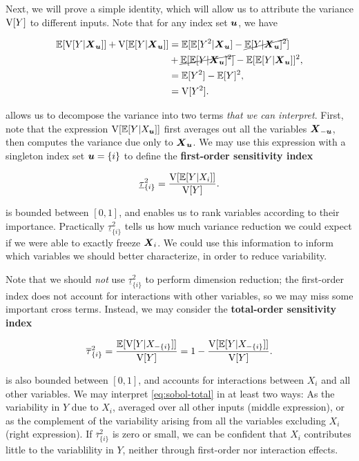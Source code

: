 \documentclass[../primer.tex]{subfiles}
\begin{document}
Next, we will prove a simple identity, which will allow us to attribute the
variance $\mathrm{V}[Y]$ to different inputs. Note that for any index set $\boldsymbol{u}$, we have

\begin{equation}\begin{aligned}\label{eq:var-decomp}
  \E[\V[Y|\mX_{\vu}]] + \V[\E[Y|\mX_{\vu}]] &= %
  \E[\E[Y^2|\mX_{\vu}] - \cancel{ \E[Y|\mX_{\vu}]^2 }] \\
  &+ \cancel{\E[\E[Y|\mX_{\vu}]^2]} - \E[\E[Y|\mX_{\vu}]]^2, \\
  &= \E[Y^2] - \E[Y]^2, \\
  &= \V[Y^2].
\end{aligned}\end{equation}

\noindent {} allows us to decompose the variance into two
terms \emph{that we can interpret}. First, note that the expression
$\mathrm{V}[\mathbb{E}[Y|X_{\boldsymbol{u}}]]$ first averages out all the variables $\boldsymbol{X}_{-\boldsymbol{u}}$, then
computes the variance due only to $\boldsymbol{X}_{\boldsymbol{u}}$. We may use this expression with a
singleton index set $\boldsymbol{u}=\{i\}$ to define the \textbf{first-order sensitivity
  index}

\begin{equation}\label{eq:sobol-first}
  \underline{\tau}_{\{i\}}^2 = \frac{\mathrm{V}[\mathbb{E}[Y|X_i]]}{\mathrm{V}[Y]}.
\end{equation}

\noindent {} is bounded between $[0,1]$, and enables us to
rank variables according to their importance. Practically
$\underline{\tau}_{\{i\}}^2$ tells us how much variance reduction we could
expect if we were able to exactly freeze $\boldsymbol{X}_i$. We could use this information
to inform which variables we should better characterize, in order to reduce
variability.

Note that we should \emph{not} use $\underline{\tau}_{\{i\}}^2$ to perform
dimension reduction; the first-order index does not account for interactions
with other variables, so we may miss some important cross terms. Instead, we may
consider the \textbf{total-order sensitivity index}

\begin{equation}\label{eq:sobol-total}
  \overline{\tau}_{\{i\}}^2 = \frac{\E[\V[Y|X_{-\{i\}}]]}{\V[Y]} = %
  1 - \frac{\V[\E[Y|X_{-\{i\}}]]}{\V[Y]}.
\end{equation}

\noindent {} is also bounded between $[0,1]$, and accounts
for interactions between $X_i$ and all other variables. We may interpret
\eqref{eq:sobol-total} in at least two ways: As the variability in $Y$ due to
$X_i$, averaged over all other inputs (middle expression), or as the complement
of the variability arising from all the variables excluding $X_i$ (right
expression). If $\overline{\tau}_{\{i\}}^2$ is zero or small, we can be
confident that $X_i$ contributes little to the variablility in $Y$, neither
through first-order nor interaction effects.
\end{document}

